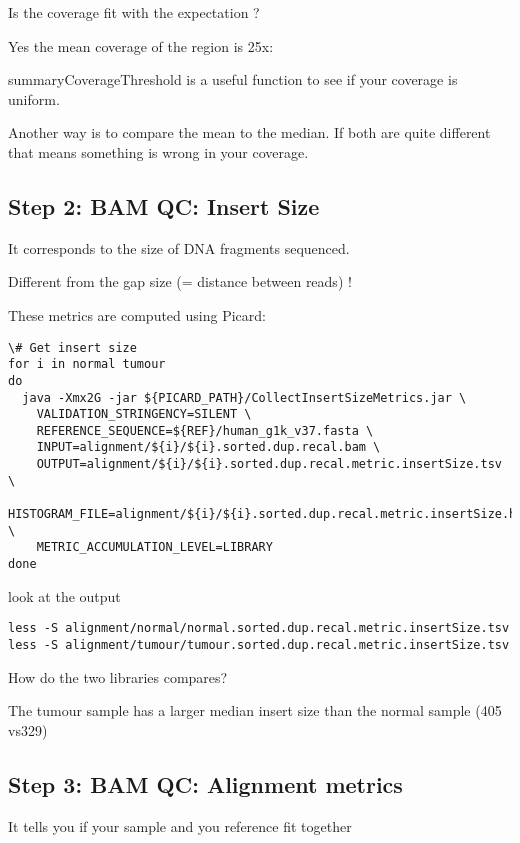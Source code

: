 \begin{questions}
Is the coverage fit with the expectation ?
\end{questions}
\begin{answer}
Yes the mean coverage of the region is 25x:

summaryCoverageThreshold is a useful function to see if your coverage is uniform.
 
Another way is to compare the mean to the median. If both are quite different that means something is wrong in your coverage.
\end{answer}

\subsection{Step 2: BAM QC: Insert Size}
It corresponds to the size of DNA fragments sequenced.

Different from the gap size (= distance between reads) !

These metrics are computed using Picard:

\begin{lstlisting}
\# Get insert size
for i in normal tumour
do
  java -Xmx2G -jar ${PICARD_PATH}/CollectInsertSizeMetrics.jar \
    VALIDATION_STRINGENCY=SILENT \
    REFERENCE_SEQUENCE=${REF}/human_g1k_v37.fasta \
    INPUT=alignment/${i}/${i}.sorted.dup.recal.bam \
    OUTPUT=alignment/${i}/${i}.sorted.dup.recal.metric.insertSize.tsv \
    HISTOGRAM_FILE=alignment/${i}/${i}.sorted.dup.recal.metric.insertSize.histo.pdf \
    METRIC_ACCUMULATION_LEVEL=LIBRARY
done
\end{lstlisting}

look at the output

\begin{lstlisting}
less -S alignment/normal/normal.sorted.dup.recal.metric.insertSize.tsv
less -S alignment/tumour/tumour.sorted.dup.recal.metric.insertSize.tsv
\end{lstlisting}

\begin{questions}
How do the two libraries compares? 
\end{questions}
\begin{answer}
The tumour sample has a larger median insert size than the normal sample (405 vs329) 
\end{answer}

\subsection{Step 3: BAM QC: Alignment metrics}
It tells you if your sample and you reference fit together

